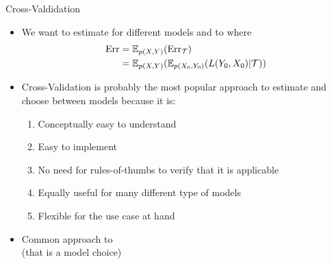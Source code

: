 \documentclass[10pt]{beamer}
\begin{document}
\begin{frame}{Cross-Valdidation}






\begin{itemize}
\item We want to estimate  for different models and to  where
\begin{align*}
\text{Err} & = \E_{p(X,Y)} (\text{Err}_\mathcal{T}) \\
 & = \E_{p(X,Y)} (\E_{p(X_0,Y_0)}(L(Y_0,X_0)|\mathcal{T})) %
\end{align*}
\item Cross-Validation is probably the most popular approach to estimate  and choose between models because it is:
\begin{enumerate}
\item Conceptually easy to understand
\item Easy to implement
\item No need for rules-of-thumbs to verify that it is applicable
\item Equally useful for many different type of models
\item Flexible for the use case at hand
\end{enumerate}
\pause
\item Common approach to \\(that is a model choice)
\end{itemize}

\end{frame}
\end{document}
